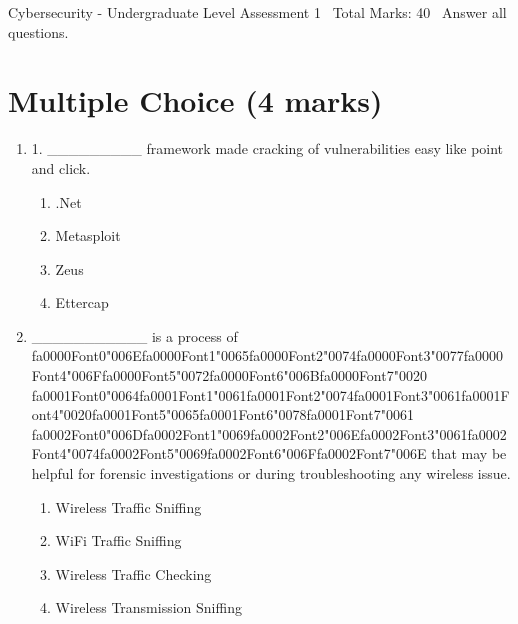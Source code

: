 \documentclass[12pt]{article}
\begin{document}
\begin{center}
Cybersecurity - Undergraduate Level Assessment 1 \
Total Marks: 40 \
Answer all questions.
\end{center}

\section*{Multiple Choice (4 marks)}
\begin{enumerate}[label=\arabic*.]
\item 1. \_\_\_\_\_\_\_\_\_ framework made cracking of vulnerabilities easy like point and click.
\begin{enumerate}[label=(\alph*)]
    \item .Net
    \item Metasploit
    \item Zeus
    \item Ettercap
\end{enumerate}
\item \_\_\_\_\_\_\_\_\_\_\_ is a process of {\csname fa0000Font0\endcsname\char"006E}{\csname fa0000Font1\endcsname\char"0065}{\csname fa0000Font2\endcsname\char"0074}{\csname fa0000Font3\endcsname\char"0077}{\csname fa0000Font4\endcsname\char"006F}{\csname fa0000Font5\endcsname\char"0072}{\csname fa0000Font6\endcsname\char"006B}{\csname fa0000Font7\endcsname\char"0020} {\csname fa0001Font0\endcsname\char"0064}{\csname fa0001Font1\endcsname\char"0061}{\csname fa0001Font2\endcsname\char"0074}{\csname fa0001Font3\endcsname\char"0061}{\csname fa0001Font4\endcsname\char"0020}{\csname fa0001Font5\endcsname\char"0065}{\csname fa0001Font6\endcsname\char"0078}{\csname fa0001Font7\endcsname\char"0061} {\csname fa0002Font0\endcsname\char"006D}{\csname fa0002Font1\endcsname\char"0069}{\csname fa0002Font2\endcsname\char"006E}{\csname fa0002Font3\endcsname\char"0061}{\csname fa0002Font4\endcsname\char"0074}{\csname fa0002Font5\endcsname\char"0069}{\csname fa0002Font6\endcsname\char"006F}{\csname fa0002Font7\endcsname\char"006E} that may be helpful for forensic investigations or during troubleshooting any wireless issue.
\begin{enumerate}[label=(\alph*)]
    \item Wireless Traffic Sniffing
    \item WiFi Traffic Sniffing
    \item Wireless Traffic Checking
    \item Wireless Transmission Sniffing
\end{enumerate}
\end{enumerate}
\end{document}

